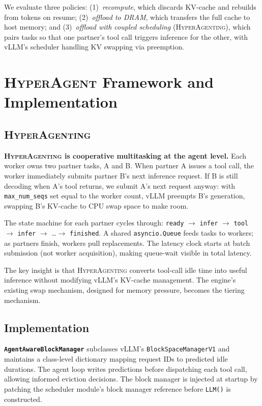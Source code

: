 \documentclass[10pt,twocolumn]{article}
\begin{document}
We evaluate three policies: (1)~\emph{recompute}, which discards KV-cache and rebuilds from tokens on resume; (2)~\emph{offload to DRAM}, which transfers the full cache to host memory; and (3)~\emph{offload with coupled scheduling} (\textsc{HyperAgenting}), which pairs tasks so that one partner's tool call triggers inference for the other, with vLLM's scheduler handling KV swapping via preemption.

\section{\textsc{HyperAgent} Framework and Implementation}

\subsection{\textsc{HyperAgenting}}

\textbf{\textsc{HyperAgenting} is cooperative multitasking at the agent level.} Each worker owns two partner tasks, A and B. When partner A issues a tool call, the worker immediately submits partner B's next inference request. If B is still decoding when A's tool returns, we submit A's next request anyway: with \texttt{max\_num\_seqs} set equal to the worker count, vLLM preempts B's generation, swapping B's KV-cache to CPU swap space to make room.

The state machine for each partner cycles through: \texttt{ready} $\to$ \texttt{infer} $\to$ \texttt{tool} $\to$ \texttt{infer} $\to$ \ldots $\to$ \texttt{finished}. A shared \texttt{asyncio.Queue} feeds tasks to workers; as partners finish, workers pull replacements. The latency clock starts at batch submission (not worker acquisition), making queue-wait visible in total latency.

The key insight is that \textsc{HyperAgenting} converts tool-call idle time into useful inference without modifying vLLM's KV-cache management. The engine's existing swap mechanism, designed for memory pressure, becomes the tiering mechanism.

\subsection{Implementation}

\textbf{\texttt{AgentAwareBlockManager}} subclasses vLLM's \texttt{BlockSpaceManagerV1} and maintains a class-level dictionary mapping request IDs to predicted idle durations. The agent loop writes predictions before dispatching each tool call, allowing informed eviction decisions. The block manager is injected at startup by patching the scheduler module's block manager reference before \texttt{LLM()} is constructed.
\end{document}
